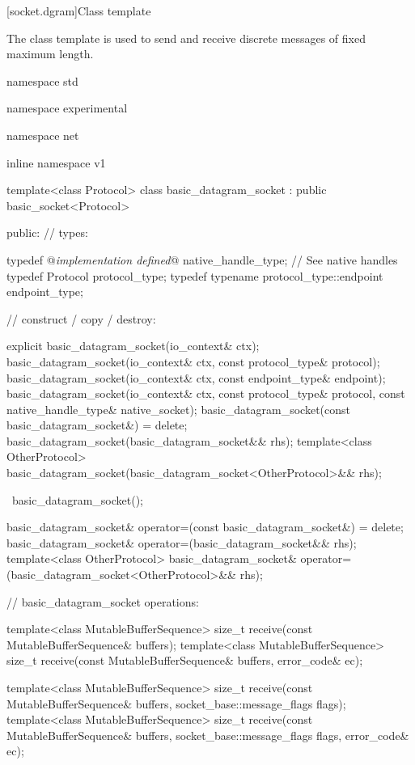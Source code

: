[socket.dgram]{Class template }

\pnum
The class template  is used to send and receive discrete messages of fixed maximum length.

\begin{codeblock}
namespace std {
namespace experimental {
namespace net {
inline namespace v1 {

  template<class Protocol>
  class basic_datagram_socket : public basic_socket<Protocol>
  {
  public:
    // types:

    typedef @\textit{implementation defined}@ native_handle_type; // See native handles
    typedef Protocol protocol_type;
    typedef typename protocol_type::endpoint endpoint_type;

    // construct / copy / destroy:

    explicit basic_datagram_socket(io_context& ctx);
    basic_datagram_socket(io_context& ctx, const protocol_type& protocol);
    basic_datagram_socket(io_context& ctx, const endpoint_type& endpoint);
    basic_datagram_socket(io_context& ctx, const protocol_type& protocol,
                          const native_handle_type& native_socket);
    basic_datagram_socket(const basic_datagram_socket&) = delete;
    basic_datagram_socket(basic_datagram_socket&& rhs);
    template<class OtherProtocol>
      basic_datagram_socket(basic_datagram_socket<OtherProtocol>&& rhs);

    ~basic_datagram_socket();

    basic_datagram_socket& operator=(const basic_datagram_socket&) = delete;
    basic_datagram_socket& operator=(basic_datagram_socket&& rhs);
    template<class OtherProtocol>
      basic_datagram_socket& operator=(basic_datagram_socket<OtherProtocol>&& rhs);

    // basic_datagram_socket operations:

    template<class MutableBufferSequence>
      size_t receive(const MutableBufferSequence& buffers);
    template<class MutableBufferSequence>
      size_t receive(const MutableBufferSequence& buffers,
                     error_code& ec);

    template<class MutableBufferSequence>
      size_t receive(const MutableBufferSequence& buffers,
                     socket_base::message_flags flags);
    template<class MutableBufferSequence>
      size_t receive(const MutableBufferSequence& buffers,
                     socket_base::message_flags flags, error_code& ec);

}}}}}
\end{codeblock}
